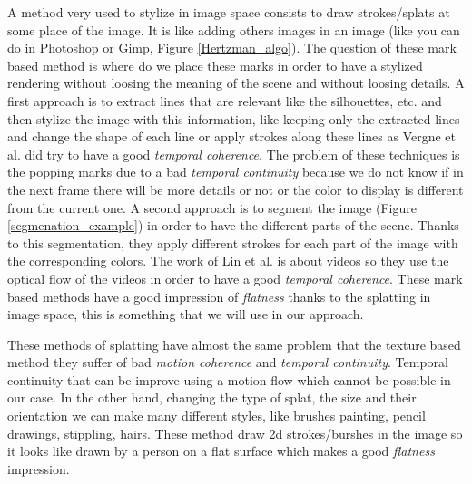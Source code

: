 A method very used to stylize in image space consists to draw strokes/splats at some place of the image\cite{bleron_motion-coherent_2018, vergne_implicit_2011, benard_active_nodate, zeng_image_2009, grabli_programmable_2010}. It is like adding others images in an image (like you can do in Photoshop or Gimp, Figure \ref{Hertzman_algo}). The question of these mark based method is where do we place these marks in order to have a stylized rendering without loosing the meaning of the scene and without loosing details. A first approach is to extract lines that are relevant like the silhouettes, etc. \cite{vergne_implicit_2011, grabli_programmable_2010, lee_line_nodate} and then stylize the image with this information, like keeping only the extracted lines and change the shape of each line or apply strokes along these lines as Vergne et al.\cite{vergne_implicit_2011} did try to have a good \textit{temporal coherence}. The problem of these techniques is the popping marks due to a bad \textit{temporal continuity} because we do not know if in the next frame there will be more details or not or the color to display is different from the current one.
A second approach is to segment the image (Figure \ref{segmenation_example}) in order to have the different parts of the scene\cite{zeng_image_2009, lin_video_nodate}. Thanks to this segmentation, they apply different strokes for each part of the image with the corresponding colors. The work of Lin et al.\cite{lin_video_nodate} is about videos so they use the optical flow of the videos in order to have a good \textit{temporal coherence}. These mark based methods have a good impression of \textit{flatness} thanks to the splatting in image space, this is something that we will use in our approach.

These methods of splatting have almost the same problem that the texture based method they suffer of bad \textit{motion coherence} and \textit{temporal continuity}. Temporal continuity that can be improve using a motion flow which cannot be possible in our case. In the other hand, changing the type of splat, the size and their orientation we can make many different styles, like brushes painting, pencil drawings, stippling, hairs. These method draw 2d strokes/burshes in the image so it looks like drawn by a person on a flat surface which makes a good \textit{flatness} impression. \newline



%

